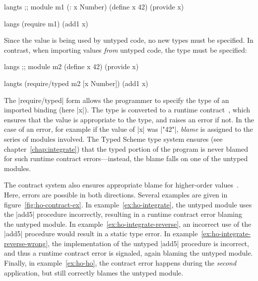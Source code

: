 \begin{schemeregion}
\begin{exmp}
\begin{schemedisplay}
langts  ;; module m1
(: x Number)
(define x 42)
(provide x)
\end{schemedisplay}
\vspace{1mm}
\begin{schemedisplay}
langs
(require m1)
(add1 x)
\end{schemedisplay}
\label{ex:integrate}
\end{exmp}
\noindent
Since the value is being used by untyped code, no new types must be
specified.  In contrast, when importing values \emph{from} untyped
code, the type must be specified:

\begin{exmp}
\begin{schemedisplay}
langs ;; module m2
(define x 42)
(provide x)
\end{schemedisplay}
\vspace{1mm}
\begin{schemedisplay}
langts
(require/typed m2 [x Number])
(add1 x)
\end{schemedisplay}
\label{ex:integrate-reverse}
\end{exmp}

The \scheme|require/typed| form allows the programmer to specify the
type of an imported binding (here \scheme|x|).  The type is
converted to a runtime
contract~\cite{m:design-by-contract-article}, which 
ensures that the value is appropriate to the type, and raises an error
if not.  In the case of an error, for example if the value of
\scheme|x| was \scheme|"42"|, \emph{blame} is assigned to
the series of modules involved.  The Typed Scheme type system ensures (see
chapter~\ref{chap:integrate}) that the typed portion of the program is
never blamed for such runtime contract errors---instead, the blame
falls on one of the untyped modules.

The contract system also ensures appropriate blame for higher-order
values~\cite{ff:ho-contracts}.  Here, errors are possible in both directions.  Several
examples are given in figure~\ref{fig:ho-contract-ex}.  In
example~\ref{ex:ho-integrate}, the untyped module uses the
\scheme|add5| procedure incorrectly, resulting in a runtime contract
error blaming the untyped module.  In
example~\ref{ex:ho-integrate-reverse}, an incorrect use of the
\scheme|add5| procedure would result in a static type error.  
In example~\ref{ex:ho-integrate-reverse-wrong}, the implementation of
the untyped \scheme|add5| procedure is incorrect, and thus a runtime
contract error is signaled, again blaming the untyped module.
Finally, in example~\ref{ex:ho-ho}, the contract error happens during
the \emph{second} application, but still correctly blames the untyped
module. 


\end{schemeregion}
